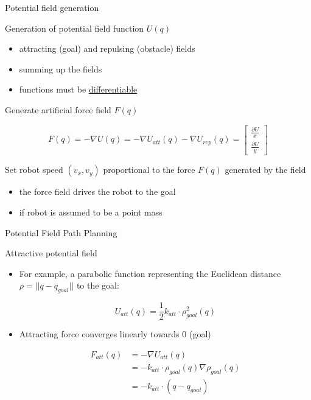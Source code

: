 \documentclass[compress,xcolor=table]{beamer}
\begin{document}
\begin{frame}{Potential field generation}

    Generation of potential field function $U(q)$

    \begin{itemize}
        \item attracting (goal) and repulsing (obstacle) fields
        \item summing up the fields
        \item functions must be
            \href{http://en.wikipedia.org/wiki/Differentiable_function}{differentiable}
    \end{itemize}

    \pause

    Generate artificial force field $F(q)$

    \[
        F(q) = -\nabla U(q) = -\nabla U_{att}(q) - \nabla U_{rep}(q) =
    \begin{bmatrix}\frac{\partial U}{x} \\ \frac{\partial U}{y}\end{bmatrix}
        \]

    \pause

    Set robot speed $(v_x, v_y)$ proportional to the force
    $F(q)$ generated by the field

    \begin{itemize}
        \item the force field drives the robot to the goal
        \item if robot is assumed to be a point mass
    \end{itemize}


\end{frame}

\begin{frame}{Potential Field Path Planning}

Attractive potential field

\begin{itemize}
\item For example, a parabolic function representing the Euclidean distance
    $\rho = || q - q_{goal} ||$ to the goal:

        \[
            U_{att}(q) = \frac{1}{2} k_{att} \cdot \rho_{goal}^2(q)
            \]

\item Attracting force converges linearly towards 0 (goal)

    \begin{align*}
        F_{att}(q) &= - \nabla U_{att}(q) \\
                &= -k_{att}\cdot \rho_{goal}(q) \nabla \rho_{goal}(q) \\
                &= -k_{att}\cdot (q - q_{goal})
    \end{align*}
\end{itemize}

\end{frame}
\end{document}
